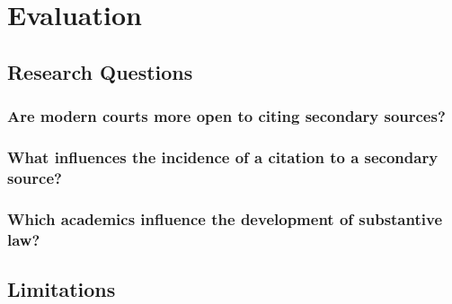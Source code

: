 \let\xn\xnote
\renewcommand\thesubsubsection{RQ\arabic{subsubsection}}

\section{Evaluation}

\subsection{Research Questions}

\subsubsection{Are modern courts more open to citing secondary sources?}

\subsubsection{What influences the incidence of a citation to a secondary source?}

\subsubsection{Which academics influence the development of substantive law?}

\subsection{Limitations}




